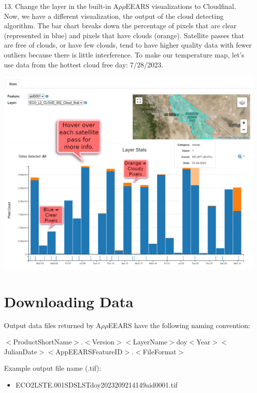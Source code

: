 \documentclass[oneside,a4paper,11pt,explicit]{book}
\begin{document}
13. Change the layer in the built-in A$\rho\rho$EEARS visualizations to Cloud\textunderscore final. Now, we have a different visualization, the output of the cloud detecting algorithm. The bar chart breaks down the percentage of pixels that are clear (represented in blue) and pixels that have clouds (orange). Satellite passes that are free of clouds, or have few clouds, tend to have higher quality data with fewer outliers because there is little interference. To make our temperature map, let's use data from the hottest cloud free day: 7/28/2023. 

\centerline{\includegraphics[width=\textwidth]{ExploreClouds.png}}

\section{Downloading Data}

Output data files returned by A$\rho\rho$EEARS have the following naming convention:  

\vspace{.5em}

\small{$<$ProductShortName$>$.$<$Version$>$\textunderscore $<$LayerName$>$\textunderscore doy$<$Year$>$$<$JulianDate$>$\textunderscore $<$AppEEARSFeatureID$>$.$<$FileFormat$>$}

\vspace{.5em}

Example output file name (.tif): 
\begin{itemize}
	\item ECO2LSTE.001\textunderscore SDS\textunderscore LST\textunderscore doy2023209214149\textunderscore aid0001.tif 
\end{itemize}
\end{document}

